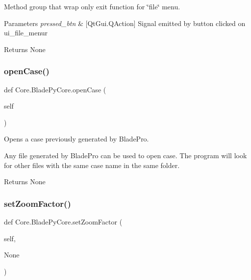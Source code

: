 Method group that wrap only exit function for \char`\"{}file\char`\"{} menu. 


\begin{DoxyParams}{Parameters}
{\em pressed\+\_\+btn} & \mbox{[}Qt\+Gui.\+Q\+Action\mbox{]} Signal emitted by button clicked on ui\+\_\+file\+\_\+menur \\
\hline
\end{DoxyParams}
\begin{DoxyReturn}{Returns}
None 
\end{DoxyReturn}
\hypertarget{a00081_ac45b825bd62e01689fb2987a0a2d850a}{}\label{a00081_ac45b825bd62e01689fb2987a0a2d850a} 
\subsubsection{\texorpdfstring{open\+Case()}{openCase()}}
{\footnotesize\ttfamily def Core.\+Blade\+Py\+Core.\+open\+Case (\begin{DoxyParamCaption}\item[{}]{self }\end{DoxyParamCaption})}



Opens a case previously generated by Blade\+Pro. 

Any file generated by Blade\+Pro can be used to open case. The program will look for other files with the same case name in the same folder.

\begin{DoxyReturn}{Returns}
None 
\end{DoxyReturn}
\hypertarget{a00081_a2c818d907d8c5797873e1a7ad54c7d13}{}\label{a00081_a2c818d907d8c5797873e1a7ad54c7d13} 
\subsubsection{\texorpdfstring{set\+Zoom\+Factor()}{setZoomFactor()}}
{\footnotesize\ttfamily def Core.\+Blade\+Py\+Core.\+set\+Zoom\+Factor (\begin{DoxyParamCaption}\item[{}]{self,  }\item[{}]{None }\end{DoxyParamCaption})}



